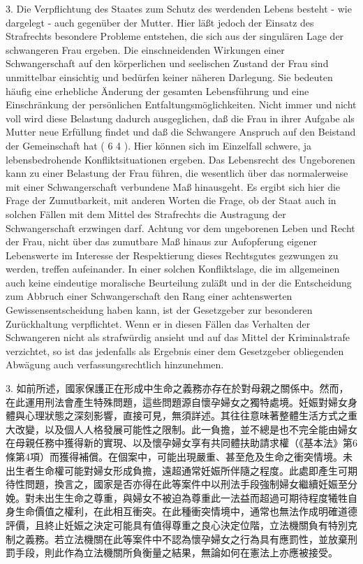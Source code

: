 \documentclass[12pt]{article}
\begin{document}
\syncleft
\begin{sourcepara}
3. Die Verpflichtung des Staates zum Schutz des werdenden Lebens besteht - wie dargelegt - auch gegenüber der Mutter. Hier läßt jedoch der Einsatz des Strafrechts besondere Probleme entstehen, die sich aus der singulären Lage der schwangeren Frau ergeben. Die einschneidenden Wirkungen einer Schwangerschaft auf den körperlichen und seelischen Zustand der Frau sind unmittelbar einsichtig und bedürfen keiner näheren Darlegung. Sie bedeuten häufig eine erhebliche Änderung der gesamten Lebensführung und eine Einschränkung der persönlichen Entfaltungsmöglichkeiten. Nicht immer und nicht voll wird diese Belastung dadurch ausgeglichen, daß die Frau in ihrer Aufgabe als Mutter neue Erfüllung findet und daß die Schwangere Anspruch auf den Beistand der Gemeinschaft hat (\abbrArt{} 6 \abbrAbs{} 4 \abbrGG{}). Hier können sich im Einzelfall schwere, ja lebensbedrohende Konfliktsituationen ergeben. Das Lebensrecht des Ungeborenen kann zu einer Belastung der Frau führen, die wesentlich über das normalerweise mit einer Schwangerschaft verbundene Maß hinausgeht. Es ergibt sich hier die Frage der Zumutbarkeit, mit anderen Worten die Frage, ob der Staat auch in solchen Fällen mit dem Mittel des Strafrechts die Austragung der Schwangerschaft erzwingen darf. Achtung vor dem ungeborenen Leben und Recht der Frau, nicht über das zumutbare Maß hinaus zur Aufopferung eigener Lebenswerte im Interesse der Respektierung dieses Rechtsgutes gezwungen zu werden, treffen aufeinander. In einer solchen Konfliktslage, die im allgemeinen auch keine eindeutige moralische Beurteilung zuläßt und in der die Entscheidung zum Abbruch einer Schwangerschaft den Rang einer achtenswerten Gewissensentscheidung haben kann, ist der Gesetzgeber zur besonderen Zurückhaltung verpflichtet. Wenn er in diesen Fällen das Verhalten der Schwangeren nicht als strafwürdig ansieht und auf das Mittel der Kriminalstrafe verzichtet, so ist das jedenfalls als Ergebnis einer dem Gesetzgeber obliegenden Abwägung auch verfassungsrechtlich hinzunehmen.
\end{sourcepara}
\begin{transpara}
3. 如前所述，國家保護正在形成中生命之義務亦存在於對母親之關係中。然而，在此運用刑法會產生特殊問題，這些問題源自懷孕婦女之獨特處境。妊娠對婦女身體與心理狀態之深刻影響，直接可見，無須詳述。其往往意味著整體生活方式之重大改變，以及個人人格發展可能性之限制。此一負擔，並不總是也不完全能由婦女在母親任務中獲得新的實現、以及懷孕婦女享有共同體扶助請求權（《基本法》第6條第4項）而獲得補償。在個案中，可能出現嚴重、甚至危及生命之衝突情境。未出生者生命權可能對婦女形成負擔，遠超通常妊娠所伴隨之程度。此處即產生可期待性問題，換言之，國家是否亦得在此等案件中以刑法手段強制婦女繼續妊娠至分娩。對未出生生命之尊重，與婦女不被迫為尊重此一法益而超過可期待程度犧牲自身生命價值之權利，在此相互衝突。在此種衝突情境中，通常也無法作成明確道德評價，且終止妊娠之決定可能具有值得尊重之良心決定位階，立法機關負有特別克制之義務。若立法機關在此等案件中不認為懷孕婦女之行為具有應罰性，並放棄刑罰手段，則此作為立法機關所負衡量之結果，無論如何在憲法上亦應被接受。
\end{transpara}
\end{document}
